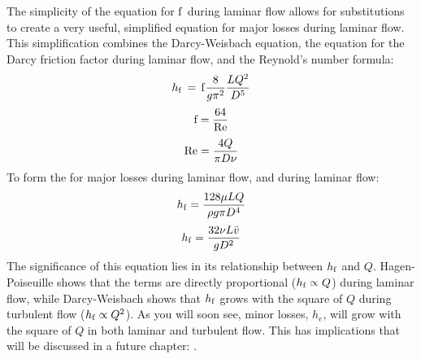 \documentclass[letterpaper,10pt,english]{sphinxmanual}
\begin{document}
The simplicity of the equation for \(\rm{f}\) during laminar flow allows for substitutions to create a very useful, simplified equation for major losses during laminar flow. This simplification combines the Darcy-Weisbach equation, the equation for the Darcy friction factor during laminar flow, and the Reynold’s number formula:
\begin{equation}\label{equation:Review/Review_Fluid_Mechanics:Review/Review_Fluid_Mechanics:7}
\begin{split}h_{\rm{f}} \, = \,{\rm{f}} \frac{8}{g \pi^2} \frac{LQ^2}{D^5}\end{split}
\end{equation}\begin{equation}\label{equation:Review/Review_Fluid_Mechanics:Review/Review_Fluid_Mechanics:8}
\begin{split}{\rm{f}} = \frac{64}{\rm{Re}}\end{split}
\end{equation}\begin{equation}\label{equation:Review/Review_Fluid_Mechanics:Review/Review_Fluid_Mechanics:9}
\begin{split}{\rm{Re}}=\frac{4Q}{\pi D\nu}\end{split}
\end{equation}
To form the  for major losses during laminar flow, and  during laminar flow:
\begin{equation}\label{equation:Review/Review_Fluid_Mechanics:hagen_poiseuille}
\begin{split}  h_{\rm{f}} = \frac{128\mu L Q}{\rho g\pi D^4}\end{split}
\end{equation}\begin{equation}\label{equation:Review/Review_Fluid_Mechanics:Review/Review_Fluid_Mechanics:10}
\begin{split}h_{\rm{f}} = \frac{32\nu L\bar v}{ g D^2}\end{split}
\end{equation}
The significance of this equation lies in its relationship between \(h_{\rm{f}}\) and \(Q\). Hagen-Poiseuille shows that the terms are directly proportional (\(h_{\rm{f}} \propto Q\)) during laminar flow, while Darcy-Weisbach shows that \(h_{\rm{f}}\) grows with the square of \(Q\) during turbulent flow (\(h_{\rm{f}} \propto Q^2\)). As you will soon see, minor losses, \(h_e\), will grow with the square of \(Q\) in both laminar and turbulent flow. This has implications that will be discussed in a future chapter: {\hyperref[\detokenize{Flow_Control_and_Measurement/FCM_Design:title-flow-control-design}]{}}.
\end{document}
